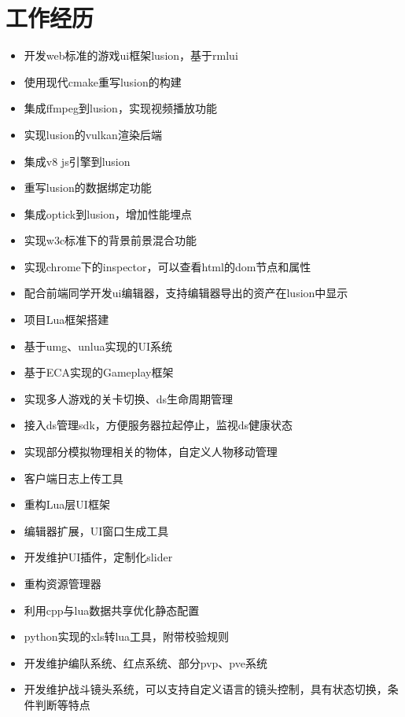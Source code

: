 \documentclass{resume}
\begin{document}
\section{工作经历}
\begin{itemize}
  \item 开发web标准的游戏ui框架lusion，基于rmlui
  \item 使用现代cmake重写lusion的构建
  \item 集成ffmpeg到lusion，实现视频播放功能
  \item 实现lusion的vulkan渲染后端
  \item 集成v8 js引擎到lusion
  \item 重写lusion的数据绑定功能
  \item 集成optick到lusion，增加性能埋点
  \item 实现w3c标准下的背景前景混合功能
  \item 实现chrome下的inspector，可以查看html的dom节点和属性
  \item 配合前端同学开发ui编辑器，支持编辑器导出的资产在lusion中显示
\end{itemize}
\begin{itemize}
  \item 项目Lua框架搭建
  \item 基于umg、unlua实现的UI系统
  \item 基于ECA实现的Gameplay框架
  \item 实现多人游戏的关卡切换、ds生命周期管理
  \item 接入ds管理sdk，方便服务器拉起停止，监视ds健康状态
  \item 实现部分模拟物理相关的物体，自定义人物移动管理
  \item 客户端日志上传工具
\end{itemize}
\begin{itemize}
  \item 重构Lua层UI框架
  \item 编辑器扩展，UI窗口生成工具
  \item 开发维护UI插件，定制化slider
  \item 重构资源管理器
  \item 利用cpp与lua数据共享优化静态配置
  \item python实现的xls转lua工具，附带校验规则
  \item 开发维护编队系统、红点系统、部分pvp、pve系统
  \item 开发维护战斗镜头系统，可以支持自定义语言的镜头控制，具有状态切换，条件判断等特点
\end{itemize}



%
%
\end{document}

